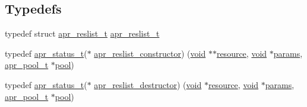 \subsection*{Typedefs}
\begin{DoxyCompactItemize}
\item 
typedef struct \hyperlink{structapr__reslist__t}{apr\+\_\+reslist\+\_\+t} \hyperlink{group__APR__Util__RL_ga670f6719dfeffe1037e063eaab7b82ac}{apr\+\_\+reslist\+\_\+t}
\item 
typedef \hyperlink{group__apr__errno_gaa5105fa83cc322f09382292db8b47593}{apr\+\_\+status\+\_\+t}($\ast$ \hyperlink{group__APR__Util__RL_ga57065208a6925b61f5ca96ade452a3d6}{apr\+\_\+reslist\+\_\+constructor}) (\hyperlink{group__MOD__ISAPI_gacd6cdbf73df3d9eed42fa493d9b621a6}{void} $\ast$$\ast$\hyperlink{group__APR__Util__RL_gaa6244aacafcc4ec1d0727bdb32614b11}{resource}, \hyperlink{group__MOD__ISAPI_gacd6cdbf73df3d9eed42fa493d9b621a6}{void} $\ast$\hyperlink{group__APR__Util__RL_ga1d35e736cdbc73587323e02e92a68713}{params}, \hyperlink{structapr__pool__t}{apr\+\_\+pool\+\_\+t} $\ast$\hyperlink{group__APR__XLATE_gabb3cd978f04c73d0b763c391e9bfde73}{pool})
\item 
typedef \hyperlink{group__apr__errno_gaa5105fa83cc322f09382292db8b47593}{apr\+\_\+status\+\_\+t}($\ast$ \hyperlink{group__APR__Util__RL_gab642eccd03379810b6beb1e7bf009dad}{apr\+\_\+reslist\+\_\+destructor}) (\hyperlink{group__MOD__ISAPI_gacd6cdbf73df3d9eed42fa493d9b621a6}{void} $\ast$\hyperlink{group__APR__Util__RL_gaa6244aacafcc4ec1d0727bdb32614b11}{resource}, \hyperlink{group__MOD__ISAPI_gacd6cdbf73df3d9eed42fa493d9b621a6}{void} $\ast$\hyperlink{group__APR__Util__RL_ga1d35e736cdbc73587323e02e92a68713}{params}, \hyperlink{structapr__pool__t}{apr\+\_\+pool\+\_\+t} $\ast$\hyperlink{group__APR__XLATE_gabb3cd978f04c73d0b763c391e9bfde73}{pool})
\end{DoxyCompactItemize}
